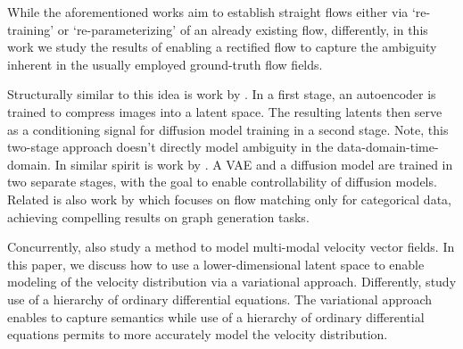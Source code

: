 While the aforementioned works aim to establish straight flows either via `re-training' or `re-parameterizing' of an already existing flow, differently, in this work we study the results of enabling a rectified flow to capture the ambiguity inherent in the usually employed ground-truth flow fields. %

Structurally similar to this idea is work by
\citet{preechakul2022diffusion}. In a first stage, an autoencoder is trained to compress images into a latent space. The resulting latents then serve as a conditioning signal for diffusion model training in a second stage. Note, this two-stage approach doesn't directly model ambiguity in the data-domain-time-domain. %
In similar spirit is work by \citet{pandey2022diffusevae}. A VAE and a diffusion model are trained in two separate stages, with the goal to enable controllability of diffusion models. %
Related is also work by \citet{eijkelboom2024variational} which focuses on flow matching  only for categorical data, achieving compelling results on graph generation tasks. 

Concurrently, \citet{ZhangICLR2025} also study a method to model multi-modal velocity vector fields. In this paper, we discuss how to use a lower-dimensional latent space to enable modeling of the velocity distribution via a variational approach. Differently, \citet{ZhangICLR2025} study use of a hierarchy of ordinary differential equations. The variational approach enables to capture semantics while use of a hierarchy of ordinary differential equations permits to more accurately model the velocity distribution.
